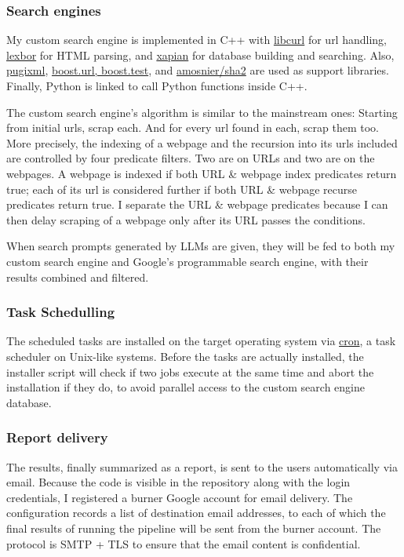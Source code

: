 \documentclass[final-report]{report-template}
\begin{document}
\subsubsection{Search engines}
My custom search engine is implemented in C++ with
\href{https://curl.se/libcurl/}{\ttfamily libcurl} for url handling,
\href{https://lexbor.com/}{\ttfamily lexbor} for HTML parsing, and
\href{https://xapian.org/docs/}{\ttfamily xapian} for database building and
searching. Also, \href{https://pugixml.org/}{\ttfamily pugixml},
\href{https://www.boost.org/}{\ttfamily boost.url, boost.test}, and
\href{https://github.com/amosnier/sha-2}{\ttfamily amosnier/sha2} are used as
support libraries. Finally, Python is linked to call Python functions inside
C++.

The custom search engine's algorithm is similar to the mainstream ones:
Starting from initial urls, scrap each. And for every url found in each, scrap
them too.  More precisely, the indexing of a webpage and the recursion into its
urls included are controlled by four predicate filters. Two are on URLs and two
are on the webpages. A webpage is indexed if both URL \& webpage index
predicates return true; each of its url is considered further if both URL \&
webpage recurse predicates return true. I separate the URL \& webpage
predicates because I can then delay scraping of a webpage only after its URL
passes the conditions.

When search prompts generated by LLMs are given, they will be fed to both my
custom search engine and Google's programmable search engine, with their
results combined and filtered.

\subsubsection{Task Schedulling}
The scheduled tasks are installed on the target operating system via
\href{https://en.wikipedia.org/wiki/Cron}{cron}, a task scheduler on Unix-like
systems. Before the tasks are actually installed, the installer script will
check if two jobs execute at the same time and abort the installation if they
do, to avoid parallel access to the custom search engine database.

\subsubsection{Report delivery} 
The results, finally summarized as a report, is sent to the users automatically
via email. Because the code is visible in the repository along with the login
credentials, I registered a burner Google account for email delivery. The
configuration records a list of destination email addresses, to each of which
the final results of running the pipeline will be sent from the burner account.
The protocol is SMTP + TLS to ensure that the email content is confidential.
\end{document}
